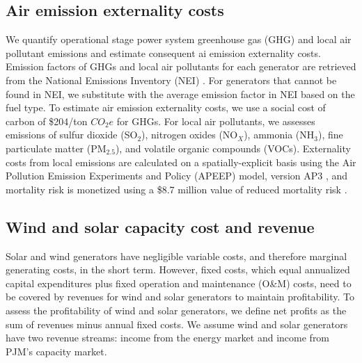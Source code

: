 \documentclass[9pt,twocolumn,twoside,lineno]{pnas-new}
\begin{document}
{\subsection{Air emission externality costs}
We quantify operational stage power system greenhouse gas (GHG) and local air pollutant emissions and estimate consequent ai emission externality costs. Emission factors of GHGs and local air pollutants for each generator are retrieved from the National Emissions Inventory (NEI) \cite{us_epa_national_2015}. For generators that cannot be found in NEI, we substitute with the average emission factor in NEI based on the fuel type. To estimate air emission externality costs, we use a social cost of carbon of \$204/ton $CO_2e$ \cite{noauthor_epa_2023} for GHGs. For local air pollutants, we assesses emissions of sulfur dioxide (SO$_2$), nitrogen oxides (NO$_X$), ammonia (NH$_3$), fine particulate matter (PM$_{2.5}$), and volatile organic compounds (VOCs). Externality costs from local emissions are calculated on a spatially-explicit basis using the Air Pollution Emission Experiments and Policy (APEEP) model, version AP3 , and mortality risk is monetized using a \$8.7 million value of reduced mortality risk \cite{clay_external_2019}. 

\subsection{Wind and solar capacity cost and revenue}\label{revenueassess}
Solar and wind generators have negligible variable costs, and therefore marginal generating costs, in the short term. However, fixed costs, which equal annualized capital expenditures plus fixed operation and maintenance (O\&M) costs, need to be covered by revenues for wind and solar generators to maintain profitability. To assess the profitability of wind and solar generators, we define net profits as the sum of revenues minus annual fixed costs. We assume wind and solar generators have two revenue streams: income from the energy market and income from PJM's capacity market. 

}
\end{document}
